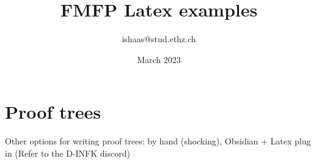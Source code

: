 \documentclass{article}
\title{FMFP Latex examples}
\author{ishaas@stud.ethz.ch}
\date{March 2023}
\begin{document}
\maketitle

\section{Proof trees}
Other options for writing proof trees: by hand (shocking), Obsidian + Latex plug in (Refer to the D-INFK discord)
\end{document}
